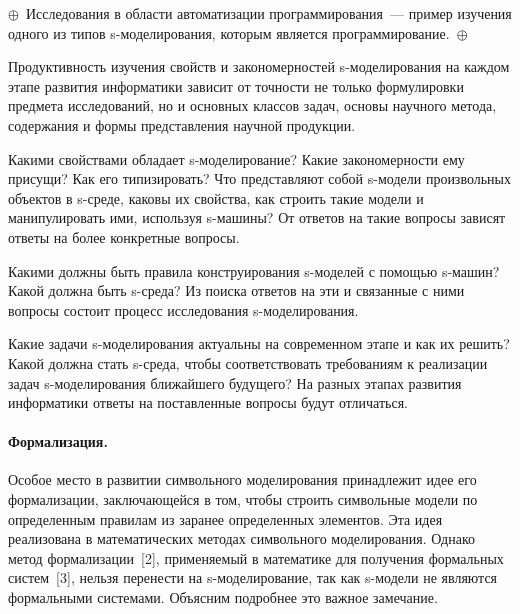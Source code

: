 \begin{multicols}{2}
{}



\noindent
$\oplus$~Исследования в области автоматизации программирования~---
пример изучения одного из типов s-моделирования, которым является
программирование.~$\oplus$

Продуктивность изучения свойств и закономерностей s-моделирования на каждом 
этапе развития информатики зависит от точности не только формулировки предмета 
исследований, но и основных классов задач, основы научного метода, содержания и 
формы представления научной продукции.

Какими свойствами обладает s-моделирование? Какие закономерности ему
присущи? Как его типизировать? Что представляют собой s-модели
произвольных объектов в s-среде, каковы их свойства, как строить такие
модели и манипулировать ими, используя s-машины? От ответов на такие
вопросы зависят ответы на более конкретные вопросы.

Какими должны быть
правила конструирования s-моделей с помощью s-машин? Какой должна быть
s-среда? Из поиска ответов на эти и связанные с ними вопросы состоит процесс
исследования s-моделирования.

Какие задачи s-моделирования актуальны на современном этапе и как их
решить? Какой должна стать s-среда, чтобы соответствовать требованиям к
реализации задач s-моделирования ближайшего будущего? На разных этапах
развития информатики ответы на поставленные вопросы будут отличаться.

\paragraph*{Формализация.}Особое место в развитии символьного моделирования принадлежит идее
его формализации, заключающейся в том, чтобы строить символьные модели
по определенным правилам из заранее определенных элементов. Эта идея
реализована в математических методах символьного моделирования. Однако
метод формализации~[2],
применяемый в математике для получения
формальных систем~[3],
нельзя перенести на s-моделирование, так как
s-модели не являются формальными системами. Объясним подробнее это
важное замечание.


\end{multicols}
